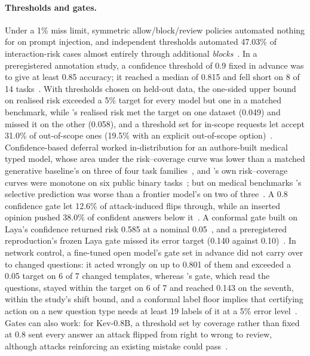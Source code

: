 \paragraph{Thresholds and gates.}
Under a 1\% miss limit, symmetric allow/block/review policies automated nothing for \jev{} on prompt injection, and independent thresholds automated 47.03\% of interaction-risk cases almost entirely through additional \emph{blocks}~\cite{arx33401}.
In a preregistered annotation study, a confidence threshold of 0.9 fixed in advance was to give at least 0.85 accuracy; it reached a median of 0.815 and fell short on 8 of 14 tasks~\cite{arx24574}.
With thresholds chosen on held-out data, the one-sided upper bound on realised risk exceeded a 5\% target for every model but one in a matched benchmark, while \jev{}'s realised risk met the target on one dataset (0.049) and missed it on the other (0.058), and a threshold set for in-scope requests let \jev{} accept 31.0\% of out-of-scope ones (19.5\% with an explicit out-of-scope option)~\cite{arx00346}.
Confidence-based deferral worked in-distribution for an authors-built medical typed model, whose area under the risk--coverage curve was lower than a matched generative baseline's on three of four task families~\cite{arx00381}, and \jev{}'s own risk--coverage curves were monotone on six public binary tasks~\cite{zen22885291}\zmark{}; but on medical benchmarks \jev{}'s selective prediction was worse than a frontier model's on two of three~\cite{arx34024}.
A 0.8 confidence gate let 12.6\% of attack-induced flips through, while an inserted opinion pushed 38.0\% of confident answers below it~\cite{arx31142}.
A conformal gate built on Laya's confidence returned risk 0.585 at a nominal 0.05~\cite{zen23041163}\zmark{}, and a preregistered reproduction's frozen Laya gate missed its error target (0.140 against 0.10)~\cite{arx33843}.
In network control, a fine-tuned open model's gate set in advance did not carry over to changed questions: it acted wrongly on up to 0.801 of them and exceeded a 0.05 target on 6 of 7 changed templates, whereas \jev{}'s gate, which read the questions, stayed within the target on 6 of 7 and reached 0.143 on the seventh, within the study's shift bound, and a conformal label floor implies that certifying action on a new question type needs at least 19 labels of it at a 5\% error level~\cite{arx33689}. Gates can also work: for Kev-0.8B, a threshold set by coverage rather than fixed at 0.8 sent every answer an attack flipped from right to wrong to review, although attacks reinforcing an existing mistake could pass~\cite{zen22959854,zen23038928}\zmark{}.

